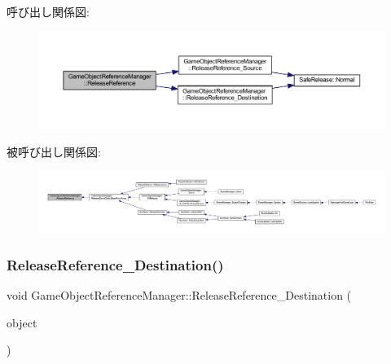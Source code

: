 呼び出し関係図\+:\nopagebreak
\begin{figure}[H]
\begin{center}
\leavevmode
\includegraphics[width=350pt]{class_game_object_reference_manager_ac7d117427de3052f893228408a3de5d7_cgraph}
\end{center}
\end{figure}
被呼び出し関係図\+:
\nopagebreak
\begin{figure}[H]
\begin{center}
\leavevmode
\includegraphics[width=350pt]{class_game_object_reference_manager_ac7d117427de3052f893228408a3de5d7_icgraph}
\end{center}
\end{figure}
\mbox{\label{class_game_object_reference_manager_af3583b94e782a7a881abba2f6be2888c}} 
\subsubsection{\texorpdfstring{Release\+Reference\+\_\+\+Destination()}{ReleaseReference\_Destination()}}
{\footnotesize\ttfamily void Game\+Object\+Reference\+Manager\+::\+Release\+Reference\+\_\+\+Destination (\begin{DoxyParamCaption}\item[{\mbox{\hyperlink{class_game_object_base}{Game\+Object\+Base}} $\ast$}]{object }\end{DoxyParamCaption})\hspace{0.3cm}{\ttfamily [private]}}



